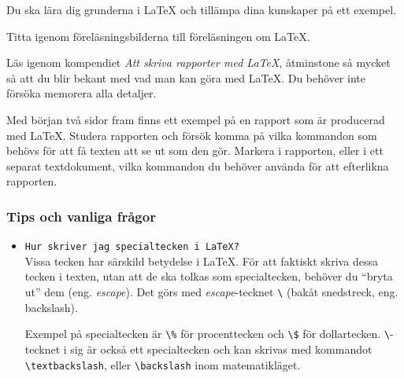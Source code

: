 
\Lab{\LabWeekEIGHTdod}
\begin{Goals}
\item Du ska lära dig grunderna i {\LaTeX} och tillämpa dina kunskaper på ett exempel.
\end{Goals}

\begin{Preparations}
\item Titta igenom föreläsningsbilderna till föreläsningen om \LaTeX.
	\item Läs igenom kompendiet \emph{Att skriva rapporter med \LaTeX}, åtminstone så mycket så att du blir bekant med vad man kan göra med \LaTeX. Du behöver inte försöka memorera alla detaljer.
	\item \label{hem:latexuppg} Med början två sidor fram finns ett exempel på en rapport som är producerad med \LaTeX. Studera rapporten och försök komma på vilka kommandon som behövs för att få texten att se ut som den gör. Markera i rapporten, eller i ett separat textdokument, vilka kommandon du behöver använda för att efterlikna rapporten.
\end{Preparations}

\subsubsection{Tips och vanliga frågor}
\begin{itemize}[nosep]

    \item \texttt{Hur skriver jag specialtecken i \LaTeX{}?}\\
          Vissa tecken har särskild betydelse i \LaTeX{}. För att faktiskt skriva dessa tecken i texten, utan att de ska tolkas som specialtecken, behöver du \enquote{bryta ut} dem (eng. \emph{escape}). Det görs med \emph{escape}-tecknet \texttt{\textbackslash} (bakåt snedstreck, eng. backslash). 

          Exempel på specialtecken är \texttt{\textbackslash\%} för procenttecken och \texttt{\textbackslash\$} för dollartecken. \texttt{\textbackslash}-tecknet i sig är också ett specialtecken och kan skrivas med kommandot \texttt{\textbackslash{textbackslash}}, eller \texttt{\textbackslash{backslash}} inom matematikläget.


\end{itemize}


